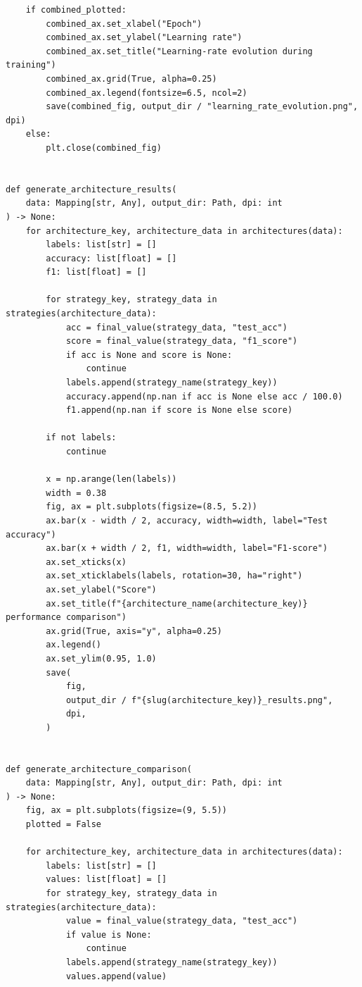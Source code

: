 \begin{verbatim}
    if combined_plotted:
        combined_ax.set_xlabel("Epoch")
        combined_ax.set_ylabel("Learning rate")
        combined_ax.set_title("Learning-rate evolution during training")
        combined_ax.grid(True, alpha=0.25)
        combined_ax.legend(fontsize=6.5, ncol=2)
        save(combined_fig, output_dir / "learning_rate_evolution.png", dpi)
    else:
        plt.close(combined_fig)


def generate_architecture_results(
    data: Mapping[str, Any], output_dir: Path, dpi: int
) -> None:
    for architecture_key, architecture_data in architectures(data):
        labels: list[str] = []
        accuracy: list[float] = []
        f1: list[float] = []

        for strategy_key, strategy_data in strategies(architecture_data):
            acc = final_value(strategy_data, "test_acc")
            score = final_value(strategy_data, "f1_score")
            if acc is None and score is None:
                continue
            labels.append(strategy_name(strategy_key))
            accuracy.append(np.nan if acc is None else acc / 100.0)
            f1.append(np.nan if score is None else score)

        if not labels:
            continue

        x = np.arange(len(labels))
        width = 0.38
        fig, ax = plt.subplots(figsize=(8.5, 5.2))
        ax.bar(x - width / 2, accuracy, width=width, label="Test accuracy")
        ax.bar(x + width / 2, f1, width=width, label="F1-score")
        ax.set_xticks(x)
        ax.set_xticklabels(labels, rotation=30, ha="right")
        ax.set_ylabel("Score")
        ax.set_title(f"{architecture_name(architecture_key)} performance comparison")
        ax.grid(True, axis="y", alpha=0.25)
        ax.legend()
        ax.set_ylim(0.95, 1.0)
        save(
            fig,
            output_dir / f"{slug(architecture_key)}_results.png",
            dpi,
        )


def generate_architecture_comparison(
    data: Mapping[str, Any], output_dir: Path, dpi: int
) -> None:
    fig, ax = plt.subplots(figsize=(9, 5.5))
    plotted = False

    for architecture_key, architecture_data in architectures(data):
        labels: list[str] = []
        values: list[float] = []
        for strategy_key, strategy_data in strategies(architecture_data):
            value = final_value(strategy_data, "test_acc")
            if value is None:
                continue
            labels.append(strategy_name(strategy_key))
            values.append(value)


\end{verbatim}
